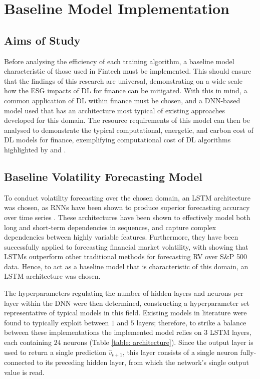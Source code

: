 \documentclass[a4paper, 11pt]{report}
\begin{document}
    \section{Baseline Model Implementation}
    \label{section: baseline}

    \subsection{Aims of Study}

    Before analysing the efficiency of each training algorithm, a baseline model characteristic of those used in Fintech must be implemented. This should ensure that the findings of this research are universal, demonstrating on a wide scale how the ESG impacts of DL for finance can be mitigated. With this in mind, a common application of DL within finance must be chosen, and a DNN-based model used that has an architecture most typical of existing approaches developed for this domain. The resource requirements of this model can then be analysed to demonstrate the typical computational, energetic, and carbon cost of DL models for finance, exemplifying computational cost of DL algorithms highlighted by \citet{amodei-2018} and \citet{schwartz-2019}.
    

    \subsection{Baseline Volatility Forecasting Model}
    \label{section: model-architecture}

    To conduct volatility forecasting over the chosen domain, an LSTM architecture was chosen, as RNNs have been shown to produce superior forecasting accuracy over time series \citep{fjellstrom-2022}. These architectures have been shown to effectively model both long and short-term dependencies in sequences, and capture complex dependencies between highly variable features. Furthermore, they have been successfully applied to forecasting financial market volatility, with \citet{bucci-2020} showing that LSTMs outperform other traditional methods for forecasting RV over S\&P 500 data. Hence, to act as a baseline model that is characteristic of this domain, an LSTM architecture was chosen.

    The hyperparameters regulating the number of hidden layers and neurons per layer within the DNN were then determined, constructing a hyperparameter set representative of typical models in this field. Existing models in literature were found to typically exploit between $1$ \citep{bucci-2020} and $5$ \citep{kim-2018} layers; therefore, to strike a balance between these implementations the implemented model relies on $3$ LSTM layers, each containing $24$ neurons (Table \ref{table: architecture}). Since the output layer is used to return a single prediction $\hat{v}_{t+1}$, this layer consists of a single neuron fully-connected to its preceding hidden layer, from which the network's single output value is read.
\end{document}

